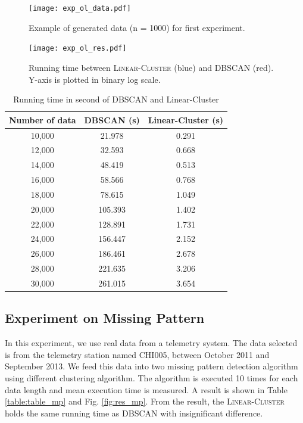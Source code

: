 \documentclass[conference]{IEEEtran}
\begin{document}
\begin{figure}
  \texttt{[image: exp\_ol\_data.pdf]}
  \caption{Example of generated data (n = 1000) for first experiment.}
  \label{fig:data_ol}
\end{figure}

  
\begin{figure}
  \texttt{[image: exp\_ol\_res.pdf]}
  \caption{Running time between \textsc{Linear-Cluster} (blue) and \textsc{DBSCAN} (red). Y-axis is plotted in binary log scale.}
  \label{fig:res_ol}
\end{figure}

\begin{table}
\caption{Running time in second of DBSCAN and Linear-Cluster}
\label{table:table_ol}
\centering
\begin{tabular}{ccc}
\hline
\textbf{Number of data} & \textbf{DBSCAN} (s) & \textbf{Linear-Cluster} (s)\\
\hline
10,000& 21.978&0.291\\
\hline
12,000& 32.593&0.668\\
\hline
14,000& 48.419&0.513\\
\hline
16,000& 58.566&0.768\\
\hline
18,000& 78.615&1.049\\
\hline
20,000&105.393&1.402\\
\hline
22,000&128.891&1.731\\
\hline
24,000&156.447&2.152\\
\hline
26,000&186.461&2.678\\
\hline
28,000&221.635&3.206\\
\hline
30,000&261.015&3.654\\
\hline
\end{tabular}
\end{table}
  

\subsection{Experiment on Missing Pattern}

In this experiment, we use real data from a telemetry system. The data selected is from the telemetry station named CHI005, between October 2011 and September 2013. We feed this data into two missing pattern detection algorithm using different clustering algorithm. The algorithm is executed 10 times for each data length and mean execution time is measured. A result is shown in Table \ref{table:table_mp} and Fig. \ref{fig:res_mp}. From the result, the \textsc{Linear-Cluster} holds the same running time as \textsc{DBSCAN} with insignificant difference.
\end{document}
